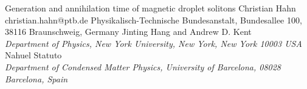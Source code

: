 \begin{conf-abstract}[]
{Generation and annihilation time of magnetic droplet solitons}
{\color{blue} Christian Hahn}
{christian.hahn@ptb.de}
{Physikalisch-Technische Bundesanstalt, Bundesallee 100, 38116 Braunschweig, Germany}
{{\color{blue}Jinting Hang and Andrew D. Kent}\\ \textit{Department of Physics, New York University, New York, New York 10003 USA}\\ 
{\color{blue}Nahuel Statuto}\\ \textit{ Department of Condensed Matter Physics, University of Barcelona, 08028 Barcelona, Spain}\\ 
\decofourleft \decofourright}





\printbibliography[heading=none]

\end{conf-abstract}
